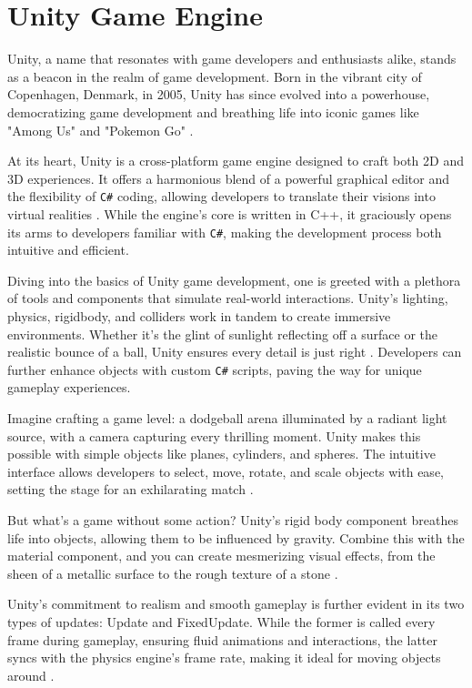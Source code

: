 \section{Unity Game Engine}

Unity, a name that resonates with game developers and enthusiasts alike, stands as a beacon in the realm of game development. Born in the vibrant city of Copenhagen, Denmark, in 2005, Unity has since evolved into a powerhouse, democratizing game development and breathing life into iconic games like "Among Us" and "Pokemon Go" \cite{unity100seconds}.

At its heart, Unity is a cross-platform game engine designed to craft both 2D and 3D experiences. It offers a harmonious blend of a powerful graphical editor and the flexibility of \texttt{C\#} coding, allowing developers to translate their visions into virtual realities \cite{unitymanual2021}. While the engine's core is written in C++, it graciously opens its arms to developers familiar with \texttt{C\#}, making the development process both intuitive and efficient.

Diving into the basics of Unity game development, one is greeted with a plethora of tools and components that simulate real-world interactions. Unity's lighting, physics, rigidbody, and colliders work in tandem to create immersive environments. Whether it's the glint of sunlight reflecting off a surface or the realistic bounce of a ball, Unity ensures every detail is just right \cite{goldstone2010}. Developers can further enhance objects with custom \texttt{C\#} scripts, paving the way for unique gameplay experiences.

Imagine crafting a game level: a dodgeball arena illuminated by a radiant light source, with a camera capturing every thrilling moment. Unity makes this possible with simple objects like planes, cylinders, and spheres. The intuitive interface allows developers to select, move, rotate, and scale objects with ease, setting the stage for an exhilarating match \cite{harrison2013}.

But what's a game without some action? Unity's rigid body component breathes life into objects, allowing them to be influenced by gravity. Combine this with the material component, and you can create mesmerizing visual effects, from the sheen of a metallic surface to the rough texture of a stone \cite{blackman2012}.

Unity's commitment to realism and smooth gameplay is further evident in its two types of updates: Update and FixedUpdate. While the former is called every frame during gameplay, ensuring fluid animations and interactions, the latter syncs with the physics engine's frame rate, making it ideal for moving objects around \cite{unityupdatefixedupdate}.

